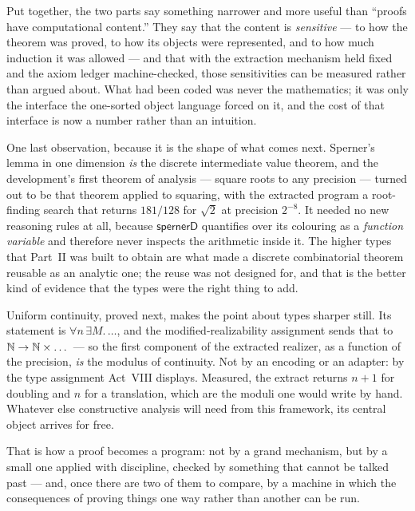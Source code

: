 Put together, the two parts say something narrower and more useful than
``proofs have computational content.'' They say that the content is
\emph{sensitive} --- to how the theorem was proved, to how its objects were
represented, and to how much induction it was allowed --- and that with the
extraction mechanism held fixed and the axiom ledger machine-checked, those
sensitivities can be measured rather than argued about. What had been coded
was never the mathematics; it was only the interface the one-sorted object
language forced on it, and the cost of that interface is now a number rather
than an intuition.

One last observation, because it is the shape of what comes next. Sperner's
lemma in one dimension \emph{is} the discrete intermediate value theorem, and
the development's first theorem of analysis --- square roots to any precision
--- turned out to be that theorem applied to squaring, with the extracted
program a root-finding search that returns $181/128$ for $\sqrt2$ at
precision $2^{-8}$. It needed no new reasoning rules at all, because
$\mathsf{spernerD}$ quantifies over its colouring as a \emph{function
variable} and therefore never inspects the arithmetic inside it. The higher
types that Part~II was built to obtain are what made a discrete combinatorial
theorem reusable as an analytic one; the reuse was not designed for, and that
is the better kind of evidence that the types were the right thing to add.

Uniform continuity, proved next, makes the point about types sharper still.
Its statement is $\forall n\,\exists M.\,\dots$, and the
modified-realizability assignment sends that to $\mathbb{N} \to \mathbb{N} \times
\dots$ --- so the first component of the extracted realizer, as a function of
the precision, \emph{is} the modulus of continuity. Not by an encoding or an
adapter: by the type assignment Act~VIII displays. Measured, the extract
returns $n{+}1$ for doubling and $n$ for a translation, which are the moduli
one would write by hand. Whatever else constructive analysis will need from
this framework, its central object arrives for free.

That is how a proof becomes a program: not by a grand mechanism, but by a
small one applied with discipline, checked by something that cannot be talked
past --- and, once there are two of them to compare, by a machine in which the
consequences of proving things one way rather than another can be run.
